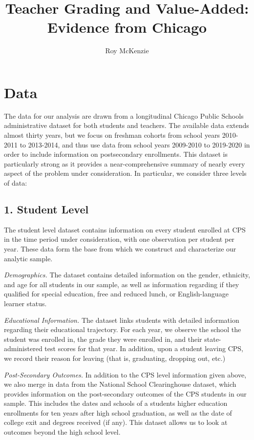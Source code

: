 \documentclass{article}
\title{Teacher Grading and Value-Added:
\\Evidence from Chicago}
\author{Roy McKenzie}
\begin{document}
\doublespacing

\section{Data}
\label{section:data}

The data for our analysis are drawn from a longitudinal Chicago Public Schools administrative dataset for both students and teachers. The available data extends almost thirty years, but we focus on freshman cohorts from school years 2010-2011 to 2013-2014, and thus use data from school years 2009-2010 to 2019-2020 in order to include information on postsecondary enrollments. This dataset is particularly strong as it provides a near-comprehensive summary of nearly every aspect of the problem under consideration. In particular, we consider three levels of data:

\subsection{1. Student Level} 

The student level dataset contains information on every student enrolled at CPS in the time period under consideration, with one observation per student per year. These data form the base from which we construct and characterize our analytic sample. 

\textit{Demographics.} The dataset contains detailed information on the gender, ethnicity, and age for all students in our sample, as well as information regarding if they qualified for special education, free and reduced lunch, or English-language learner status. 

\textit{Educational Information.} The dataset links students with detailed information regarding their educational trajectory. For each year, we observe the school the student was enrolled in, the grade they were enrolled in, and their state-administered test scores for that year. In addition, upon a student leaving CPS, we record their reason for leaving (that is, graduating, dropping out, etc.)

\textit{Post-Secondary Outcomes.} In addition to the CPS level information given above, we also merge in data from the National School Clearinghouse dataset, which provides information on the post-secondary outcomes of the CPS students in our sample. This includes the dates and schools of a students higher education enrollments for ten years after high school graduation, as well as the date of college exit and degrees received (if any). This dataset allows us to look at outcomes beyond the high school level. 
\end{document}
